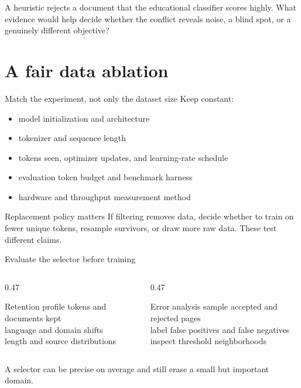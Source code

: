 \documentclass[handout]{beamer}
\begin{document}
  {A heuristic rejects a document that the educational classifier scores highly. What evidence would help decide whether the conflict reveals noise, a blind spot, or a genuinely different objective?}

\section{A fair data ablation}

\begin{frame}{Match the experiment, not only the dataset size}
  Keep constant:
  \begin{itemize}
    \setlength{\itemsep}{6pt}
    \item model initialization and architecture
    \item tokenizer and sequence length
    \item tokens seen, optimizer updates, and learning-rate schedule
    \item evaluation token budget and benchmark harness
    \item hardware and throughput measurement method
  \end{itemize}
  \begin{alertblock}{Replacement policy matters}
    If filtering removes data, decide whether to train on fewer unique tokens, resample survivors, or draw more raw data. These test different claims.
  \end{alertblock}
\end{frame}

\begin{frame}{Evaluate the selector before training}
  \begin{columns}[t]
    \begin{column}{0.47\linewidth}
      \begin{block}{Retention profile}
        tokens and documents kept\\language and domain shifts\\length and source distributions
      \end{block}
    \end{column}
    \begin{column}{0.47\linewidth}
      \begin{block}{Error analysis}
        sample accepted and rejected pages\\label false positives and false negatives\\inspect threshold neighborhoods
      \end{block}
    \end{column}
  \end{columns}
  \vfill
  \centering A selector can be precise on average and still erase a small but important domain.
\end{frame}
\end{document}
